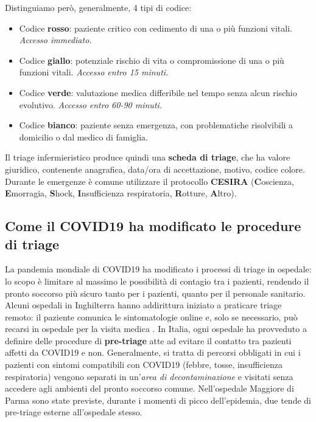 Distinguiamo però, generalmente, 4 tipi di codice:
\begin{itemize}
    \item Codice \textbf{rosso}: paziente critico con cedimento di una o più funzioni vitali. \textit{Accesso immediato.}
    \item Codice \textbf{giallo}: potenziale rischio di vita o compromissione di una o più funzioni vitali. \textit{Accesso entro 15 minuti.}
    \item Codice \textbf{verde}: valutazione medica differibile nel tempo senza alcun rischio evolutivo. \textit{Accesso entro 60-90 minuti.}
    \item Codice \textbf{bianco}: paziente senza emergenza, con problematiche risolvibili a domicilio o dal medico di famiglia.
\end{itemize}
Il triage infermieristico produce quindi una \textbf{scheda di triage}, che ha valore giuridico, contenente anagrafica, data/ora di accettazione, motivo, codice colore.
Durante le emergenze è comune utilizzare il protocollo \textbf{CESIRA} (\textbf{C}oscienza, \textbf{E}morragia, \textbf{S}hock, \textbf{I}nsufficienza respiratoria, \textbf{R}otture, \textbf{A}ltro).
\subsection{Come il COVID19 ha modificato le procedure di triage}
La pandemia mondiale di COVID19 ha modificato i processi di triage in ospedale: lo scopo è limitare al massimo le possibilità di contagio tra i pazienti, rendendo il pronto soccorso più sicuro tanto per i pazienti, quanto per il personale sanitario. Alcuni ospedali in Inghilterra hanno addirittura iniziato a praticare triage remoto: il paziente comunica le sintomatologie online e, solo se necessario, può recarsi in ospedale per la visita medica \cite{article:digital_triage}. In Italia, ogni ospedale ha provveduto a definire delle procedure di \textbf{pre-triage} atte ad evitare il contatto tra pazienti affetti da COVID19 e non. Generalmente, si tratta di percorsi obbligati in cui i pazienti con sintomi compatibili con COVID19 (febbre, tosse, insufficienza respiratoria) vengono separati in un'\textit{area di decontaminazione} e visitati senza accedere agli ambienti del pronto soccorso comune. Nell'ospedale Maggiore di Parma sono state previste, durante i momenti di picco dell'epidemia, due tende di pre-triage esterne all'ospedale stesso.
